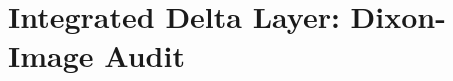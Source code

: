 \section*{Integrated Delta Layer: Dixon-Image Audit}
\providecommand{\HC}{}
\renewcommand{\HC}{\mathrm{HC}}
\providecommand{\MM}{}
\renewcommand{\MM}{\mathrm{MM}}
\providecommand{\OP}{}
\renewcommand{\OP}{\mathrm{OP}}
\providecommand{\adm}{}
\renewcommand{\adm}{\mathrm{adm}}
\providecommand{\near}{}
\renewcommand{\near}{\mathrm{near}}
\providecommand{\cert}{}
\renewcommand{\cert}{\mathrm{cert}}
\providecommand{\unr}{}
\renewcommand{\unr}{\mathrm{unr}}
\providecommand{\rk}{}
\renewcommand{\rk}{\mathrm{rk}}
\providecommand{\Dix}{}
\renewcommand{\Dix}{\mathrm{Dix}}
\providecommand{\HS}{}
\renewcommand{\HS}{\mathrm{HS}}
\providecommand{\Carrier}{}
\renewcommand{\Carrier}{\mathsf{Car}}
\providecommand{\Mask}{}
\renewcommand{\Mask}{\mathsf{Mask}}
\providecommand{\Code}{}
\renewcommand{\Code}{\mathsf{Code}}
\providecommand{\Gate}{}
\renewcommand{\Gate}{\mathsf{Gate}}
\providecommand{\Leak}{}
\renewcommand{\Leak}{\mathsf{Leak}}
\providecommand{\Debt}{}
\renewcommand{\Debt}{\mathsf{Debt}}
\providecommand{\Route}{}
\renewcommand{\Route}{\mathsf{Route}}
\providecommand{\HaloOp}{}
\renewcommand{\HaloOp}{\mathsf{Halo}}
\providecommand{\Atlas}{}
\renewcommand{\Atlas}{\mathfrak A}
\providecommand{\Rop}{}
\renewcommand{\Rop}{\mathcal R_{\OP 5}^{\adm,\near K}}
\providecommand{\Lunr}{}
\renewcommand{\Lunr}{L_{\unr}}
\providecommand{\Bhcmm}{}
\renewcommand{\Bhcmm}{B_{\HC/\MM}}
\providecommand{\C}{}
\renewcommand{\C}{\mathbb C}
\providecommand{\Hh}{}
\renewcommand{\Hh}{\mathbb H}
\providecommand{\Oo}{}
\renewcommand{\Oo}{\mathbb O}
\providecommand{\One}{}
\renewcommand{\One}{\mathbf 1}
\providecommand{\MC}{}
\renewcommand{\MC}{\mathcal M_{16}}
\providecommand{\PC}{}
\renewcommand{\PC}{\widehat P_{C_7}}
\providecommand{\Qp}{}
\renewcommand{\Qp}{Q_{\perp}}
\providecommand{\HDix}{}
\renewcommand{\HDix}{\mathcal H_{\Dix}}
\providecommand{\HFano}{}
\renewcommand{\HFano}{\mathcal F^{(3)}}
\providecommand{\HsFour}{}
\renewcommand{\HsFour}{\mathcal H^{(4)}_{16}}
\providecommand{\HsFive}{}
\renewcommand{\HsFive}{\mathcal H^{(5)}_{32}}
\providecommand{\HsSix}{}
\renewcommand{\HsSix}{\mathcal H^{(6)}_{64}}
\providecommand{\supp}{}
\renewcommand{\supp}{\operatorname{supp}}
\providecommand{\rank}{}
\renewcommand{\rank}{\operatorname{rank}}
\providecommand{\im}{}
\renewcommand{\im}{\operatorname{im}}
\providecommand{\diag}{}
\renewcommand{\diag}{\operatorname{diag}}
\providecommand{\Aut}{}
\renewcommand{\Aut}{\operatorname{Aut}}
\providecommand{\End}{}
\renewcommand{\End}{\operatorname{End}}
\providecommand{\Tr}{}
\renewcommand{\Tr}{\operatorname{Tr}}



